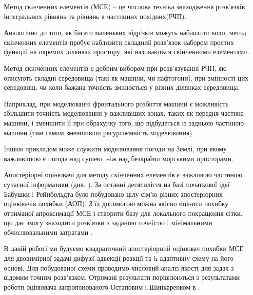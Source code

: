 

Метод скінченних елементів (МСЕ) -- це числова техніка знаходження розв'язків інтегральних рівнянь та рівнянь в частинних похідних(РЧП).

Аналогічно до того, як багато маленьких відрізків можуть наблизити коло, метод скінченних елементів пробує наблизити складний розв'язок набором простих функцій на окремих ділянках простору, які називаються скінченними елементами.

Метод скінченних елементів є добрим вибором при розв'язуванні РЧП, які описують складні середовища (такі як машини, чи нафтогони), при змінності цих середовищ, чи коли бажана точність змінюється у різних ділянках середовища.

Наприклад, при моделюванні фронтального розбиття машини є можливість збільшити точність моделювання у важливіших зонах, таких як передня частина машини, і зменшити її при обрахунку того, що відбудеться із задньою частиною машини (тим самим зменшивши ресурсоємність моделювання).

Іншим прикладом може служити моделювання погоди на Землі, при якому важливішою є погода над сушею, ніж над безкраїми морськими просторами.

Апостеріорні оцінювачі для методу скінченних елементів є важливою частиною сучасної інформатики (див. \cite{verfurth1996review, verfurth1994posteriori,eriksson1995introduction,ainsworth2011posteriori}). За останні десятиліття на базі початкової ідеї Бабушки і Рейнбольдта \cite{babuvska1978posteriori} було побудовано цілу сім'ю різних апостеріорних оцінювачів похибки (АОП). З їх допомогою можна якісно оцінити похибку отриманої апроксимації МСЕ і створити базу для локального покращення сітки, що дає змогу знаходити розв'язки з заданою точністю і мінімальними обчислювальними затратами \cite{babuska2011finite}.

В даній роботі ми будуємо квадратичний апостеріорний оцінювач похибки МСЕ для двовимірної задачі дифузії-адвекції-реакції та h-адаптивну схему на його основі. Для побудованої схеми проводимо числовий аналіз якості для задач з відомим точним розв'язком.
Отримані результати порівнюються з результатами роботи оцінювача запропонованого Остаповим і Шинкаренком в \cite{OstShynAee11}.
